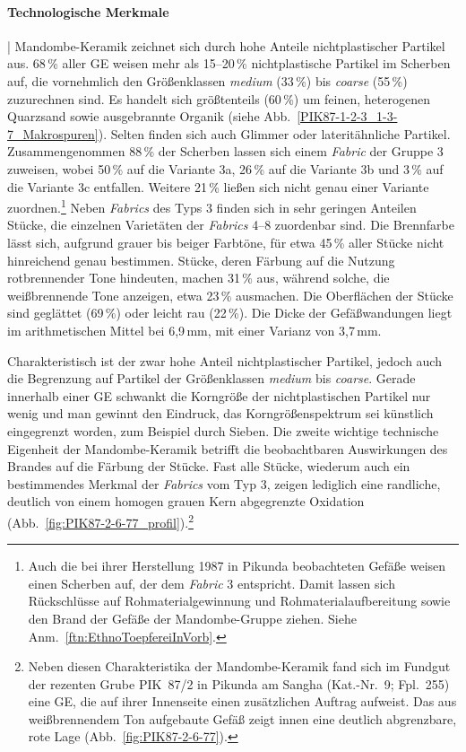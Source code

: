 \paragraph{Technologische Merkmale}\hspace{-.5em}|\hspace{.5em}%
Mandombe-Keramik zeichnet sich durch hohe Anteile nichtplastischer Partikel aus. 68\,\% aller GE weisen mehr als 15--20\,\% nichtplastische Partikel im Scherben auf, die vornehmlich den Größenklassen \textit{medium} (33\,\%) bis \textit{coarse} (55\,\%) zuzurechnen sind. Es handelt sich größtenteils (60\,\%) um feinen, heterogenen Quarzsand sowie ausgebrannte Organik (siehe Abb.~\ref{PIK87-1-2-3_1-3-7_Makrospuren}). Selten finden sich auch Glimmer oder lateritähnliche Partikel. Zusammengenommen 88\,\% der Scherben lassen sich einem \textit{Fabric} der Gruppe 3 zuweisen, wobei 50\,\% auf die Variante 3a, 26\,\% auf die Variante 3b und 3\,\% auf die Variante 3c entfallen. Weitere 21\,\% ließen sich nicht genau einer Variante zuordnen.\footnote{Auch die bei ihrer Herstellung 1987 in Pikunda beobachteten Gefäße weisen einen Scherben auf, der dem \textit{Fabric} 3 entspricht. Damit lassen sich Rückschlüsse auf Rohmaterialgewinnung und Rohmaterialaufbereitung sowie den Brand der Gefäße der Mandombe-Gruppe ziehen. Siehe Anm.~\ref{ftn:EthnoToepfereiInVorb}.} Neben \textit{Fabrics} des Typs 3 finden sich in sehr geringen Anteilen Stücke, die einzelnen Varietäten der \textit{Fabrics} 4--8 zuordenbar sind. Die Brennfarbe lässt sich, aufgrund grauer bis beiger Farbtöne, für etwa 45\,\% aller Stücke nicht hinreichend genau bestimmen. Stücke, deren Färbung auf die Nutzung rotbrennender Tone hindeuten, machen 31\,\% aus, während solche, die weißbrennende Tone anzeigen, etwa 23\,\% ausmachen. Die Oberflächen der Stücke sind geglättet (69\,\%) oder leicht rau (22\,\%). Die Dicke der Gefäßwandungen liegt im arithmetischen Mittel bei 6,9\,mm, mit einer Varianz von 3,7\,mm.

Charakteristisch ist der zwar hohe Anteil nichtplastischer Partikel, jedoch auch die Begrenzung auf Partikel der Größenklassen \textit{medium} bis \textit{coarse}. Gerade innerhalb einer GE schwankt die Korngröße der nichtplastischen Partikel nur wenig und man gewinnt den Eindruck, das Korngrößenspektrum sei künstlich eingegrenzt worden, zum Beispiel durch Sieben. Die zweite wichtige technische Eigenheit der Mandombe-Keramik betrifft die beobachtbaren Auswirkungen des Brandes auf die Färbung der Stücke. Fast alle Stücke, wiederum auch ein bestimmendes Merkmal der \textit{Fabrics} vom Typ 3, zeigen lediglich eine randliche, deutlich von einem homogen grauen Kern abgegrenzte Oxidation (Abb.~\ref{fig:PIK87-2-6-77_profil}).\footnote{Neben diesen Charakteristika der Mandombe-Keramik fand sich im Fundgut der rezenten Grube PIK~87/2 in Pikunda am \mbox{Sangha} (Kat.-Nr.~9; Fpl.~255) eine GE, die auf ihrer Innenseite einen zusätzlichen Auftrag aufweist. Das aus weißbrennendem Ton aufgebaute Gefäß zeigt innen eine deutlich abgrenzbare, rote Lage (Abb.~\ref{fig:PIK87-2-6-77}).}

